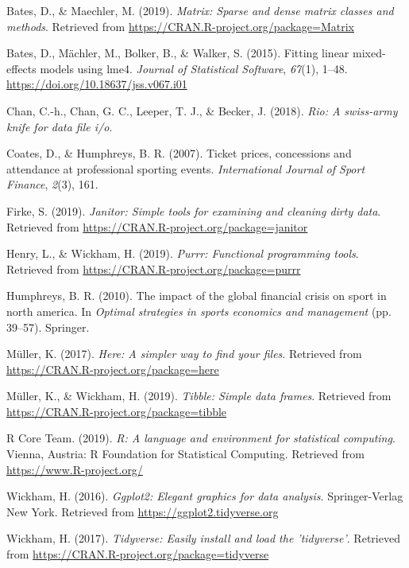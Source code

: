\documentclass[man, fleqn, noextraspace,floatsintext]{apa6}
\begin{document}
\hypertarget{ref-R-Matrix}{}
Bates, D., \& Maechler, M. (2019). \emph{Matrix: Sparse and dense matrix
classes and methods}. Retrieved from
\url{https://CRAN.R-project.org/package=Matrix}

\hypertarget{ref-R-lme4}{}
Bates, D., Mächler, M., Bolker, B., \& Walker, S. (2015). Fitting linear
mixed-effects models using lme4. \emph{Journal of Statistical Software},
\emph{67}(1), 1--48. \url{https://doi.org/10.18637/jss.v067.i01}

\hypertarget{ref-R-rio}{}
Chan, C.-h., Chan, G. C., Leeper, T. J., \& Becker, J. (2018).
\emph{Rio: A swiss-army knife for data file i/o}.

\hypertarget{ref-coates_humphreys_2007}{}
Coates, D., \& Humphreys, B. R. (2007). Ticket prices, concessions and
attendance at professional sporting events. \emph{International Journal
of Sport Finance}, \emph{2}(3), 161.

\hypertarget{ref-R-janitor}{}
Firke, S. (2019). \emph{Janitor: Simple tools for examining and cleaning
dirty data}. Retrieved from
\url{https://CRAN.R-project.org/package=janitor}

\hypertarget{ref-R-purrr}{}
Henry, L., \& Wickham, H. (2019). \emph{Purrr: Functional programming
tools}. Retrieved from \url{https://CRAN.R-project.org/package=purrr}

\hypertarget{ref-humphreys_2010}{}
Humphreys, B. R. (2010). The impact of the global financial crisis on
sport in north america. In \emph{Optimal strategies in sports economics
and management} (pp. 39--57). Springer.

\hypertarget{ref-R-here}{}
Müller, K. (2017). \emph{Here: A simpler way to find your files}.
Retrieved from \url{https://CRAN.R-project.org/package=here}

\hypertarget{ref-R-tibble}{}
Müller, K., \& Wickham, H. (2019). \emph{Tibble: Simple data frames}.
Retrieved from \url{https://CRAN.R-project.org/package=tibble}

\hypertarget{ref-R-base}{}
R Core Team. (2019). \emph{R: A language and environment for statistical
computing}. Vienna, Austria: R Foundation for Statistical Computing.
Retrieved from \url{https://www.R-project.org/}

\hypertarget{ref-R-ggplot2}{}
Wickham, H. (2016). \emph{Ggplot2: Elegant graphics for data analysis}.
Springer-Verlag New York. Retrieved from
\url{https://ggplot2.tidyverse.org}

\hypertarget{ref-R-tidyverse}{}
Wickham, H. (2017). \emph{Tidyverse: Easily install and load the
'tidyverse'}. Retrieved from
\url{https://CRAN.R-project.org/package=tidyverse}
\end{document}
